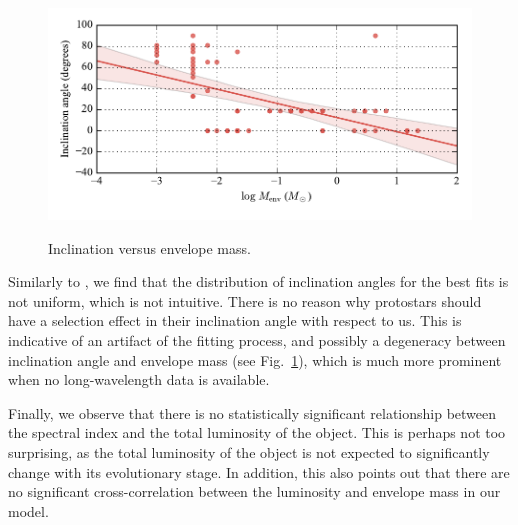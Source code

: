 \begin{figure}[!h]
\begin{center}
\includegraphics[width=\textwidth]{Figures/incVSmass.pdf}
\label{fig:incVSmass}
\vspace{-1cm}
\caption[Inclination versus mass]{Inclination versus envelope mass.}
\end{center}
\end{figure}



Similarly to \citet{Furlan:2016df}, we find that the distribution of inclination angles for the best fits is not uniform, which is not intuitive. There is no reason why protostars should have a selection effect in their inclination angle with respect to us. This is indicative of an artifact of the fitting process, and possibly a degeneracy between inclination angle and envelope mass (see Fig.~\ref{fig:incVSmass}), which is much more prominent when no long-wavelength data is available.

Finally, we observe that there is no statistically significant relationship between the spectral index and the total luminosity of the object. This is perhaps not too surprising, as the total luminosity of the object is not expected to significantly change with its evolutionary stage. In addition, this also points out that there are no significant cross-correlation between  the luminosity and envelope mass in our model. 

